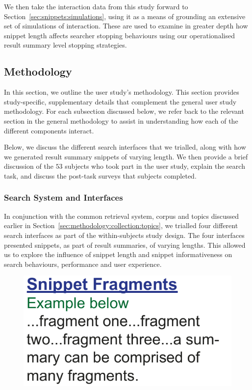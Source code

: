 We then take the interaction data from this study forward to Section~\ref{sec:snippets:simulations}, using it as a means of grounding an extensive set of simulations of interaction. These are used to examine in greater depth how snippet length affects searcher stopping behaviours using our operationalised result summary level stopping strategies.

\subsection{Methodology}\label{sec:snippets:method}
In this section, we outline the user study's methodology. This section provides study-specific, supplementary details that complement the general user study methodology. For each subsection discussed below, we refer back to the relevant section in the general methodology to assist in understanding how each of the different components interact.

Below, we discuss the different search interfaces that we trialled, along with how we generated result summary snippets of varying length. We then provide a brief discussion of the $53$ subjects who took part in the user study, explain the search task, and discuss the post-task surveys that subjects completed.

\subsubsection{Search System and Interfaces}\label{sec:snippets:method:system}
In conjunction with the common retrieval system, corpus and topics discussed earlier in Section~\ref{sec:methodology:collection:topics}, we trialled four different search interfaces as part of the within-subjects study design. The four interfaces presented snippets, as part of result summaries, of varying lengths. This allowed us to explore the influence of snippet length and snippet informativeness on search behaviours, performance and user experience.

\begin{figure}
    \begin{center}
    \vspace*{-10mm}
    \includegraphics[width=1\textwidth]{figures/ch7-fragments.pdf}
    \end{center}
    \vspace*{-4mm}
    \label{fig:fragments}
\end{figure}

